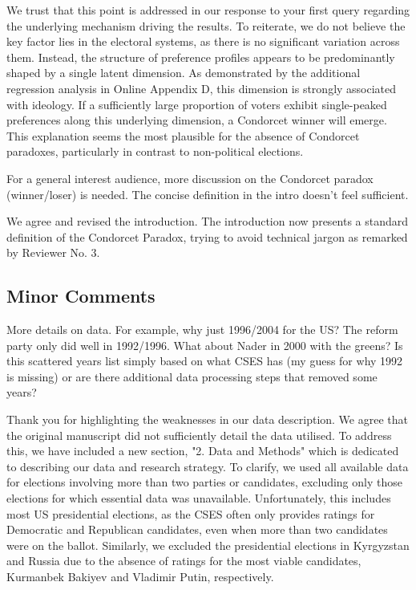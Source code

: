 \documentclass[a4paper, 12pt]{scrartcl}
\theoremstyle{break}
\newenvironment{changes}{\par\color{violet}\par\addvspace{\baselineskip}}{\par\addvspace{\baselineskip}}
\begin{document}
We trust that this point is addressed in our response to your first query regarding the underlying mechanism driving the results. To reiterate, we do not believe the key factor lies in the electoral systems, as there is no significant variation across them. Instead, the structure of preference profiles appears to be predominantly shaped by a single latent dimension. As demonstrated by the additional regression analysis in Online Appendix D, this dimension is strongly associated with ideology. If a sufficiently large proportion of voters exhibit single-peaked preferences along this underlying dimension, a Condorcet winner will emerge. This explanation seems the most plausible for the absence of Condorcet paradoxes, particularly in contrast to non-political elections.

\begin{changes}
	For a general interest audience, more discussion on the Condorcet paradox (winner/loser) is needed. The concise definition in the intro doesn’t feel sufficient.
\end{changes}

We agree and revised the introduction. The introduction now presents a standard definition of the Condorcet Paradox, trying to avoid technical jargon as remarked by Reviewer No. 3.

\subsection{Minor Comments}
\begin{changes}
	More details on data. For example, why just 1996/2004 for the US? The reform party only did well in 1992/1996. What about Nader in 2000 with the greens? Is this scattered years list simply based on what CSES has (my guess for why 1992 is missing) or are there additional data processing steps that removed some years?
\end{changes}
Thank you for highlighting the weaknesses in our data description. We agree that the original manuscript did not sufficiently detail the data utilised. To address this, we have included a new section, "2. Data and Methods" which is dedicated to describing our data and research strategy. To clarify, we used all available data for elections involving more than two parties or candidates, excluding only those elections for which essential data was unavailable. Unfortunately, this includes most US presidential elections, as the CSES often only provides ratings for Democratic and Republican candidates, even when more than two candidates were on the ballot. Similarly, we excluded the presidential elections in Kyrgyzstan and Russia due to the absence of ratings for the most viable candidates, Kurmanbek Bakiyev and Vladimir Putin, respectively.
\end{document}
